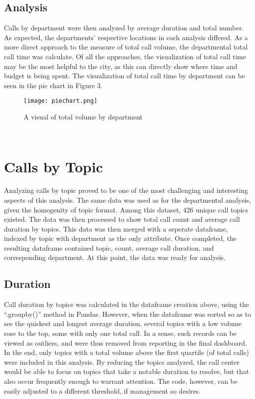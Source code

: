 \documentclass[11pt,twocolumn]{article}
\begin{document}
\subsection{Analysis}
Calls by department were then analyzed by average duration and total number.  As expected, the departments' respective locations in each analysis differed.  As a more direct approach to the measure of total call volume, the departmental total call time was calculate.  Of all the approaches, the visualization of total call time may be the most helpful to the city, as this can directly show where time and budget is being spent.  The visualization of total call time by department can be seen in the pie chart in Figure 3.
\begin{figure}[h]
  \texttt{[image: piechart.png]}
  \caption{A visual of total volume by department}
 \end{figure}
\\
 
\section{Calls by Topic}
Analyzing calls by topic proved to be one of the most challenging and interesting aspects of this analysis.  The same data was used as for the departmental analysis, given the homogenity of topic format.  Among this dataset, 426 unique call topics existed.  The data was then processed to show total call count and average call duration by topics.  This data was then merged with a seperate dataframe, indexed by topic with department as the only attribute.  Once completed, the resulting dataframe contained topic, count, average call duration, and corresponding department.  At this point, the data was ready for analysis.

\subsection{Duration}
Call duration by topics was calculated in the dataframe creation above, using the ``.groupby()'' method in Pandas.  However, when the dataframe was sorted so as to see the quickest and longest average duration, several topics with a low volume rose to the top, some with only one total call.  In a sense, such records can be viewed as outliers, and were thus removed from reporting in the final dashboard.  In the end, only topics with a total volume above the first quartile (of total calls) were included in this analysis.  By reducing the topics analyzed, the call center would be able to focus on topics that take a notable duration to resolve, but that also occur frequently enough to warrant attention.  The code, however, can be easily adjusted to a different threshold, if management so desires.
\end{document}

